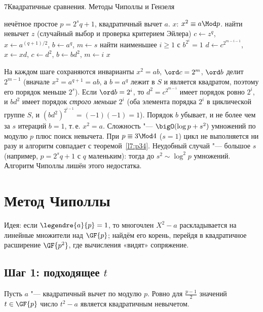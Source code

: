 \begin{lecture}{7}{Квадратичные сравнения. Методы Чиполлы и Гензеля}
\begin{algorithm}
\begin{algorithmic}[1]
\Require нечётное простое $p = 2^s q + 1$, квадратичный вычет $a$.
\Ensure $x$: $x^2 \equiv a \Mod p$.
\State найти невычет $z$ (случайный выбор и проверка критерием Эйлера)
\State $c \gets z^q$, $x \gets a^{(q+1)/2}$, $b \gets a^q$, $m \gets s$
  \State найти наименьшее $i \ge 1$ с $b^{2^i} = 1$ 
  \State $d \gets c^{2^{m - i - 1}}$, $x \gets x d$, $c \gets d^2$, $b \gets b d^2$, $m \gets i$
\EndWhile
\State \Return $x$
\end{algorithmic}
\end{algorithm}

На каждом шаге сохраняются инварианты $x^2 = ab$, $\ord c = 2^m$, $\ord b$ делит $2^{m-1}$
(вначале $x^2 = a^{q+1} = a b$, а $b = a^q$ лежит в $S$ и является квадратом, поэтому его
порядок меньше $2^s$). Если $\ord b = 2^i$, то $d^2 = c^{2^{m-i}}$ имеет порядок ровно $2^i$, и
$b d^2$ имеет порядок \emph{строго меньше} $2^i$ (оба элемента порядка $2^i$ в циклической
группе $S$, и $(bd^2)^{2^{i-1}} = (-1)(-1) = 1$). Порядок $b$ убывает, и не более чем за $s$
итераций $b = 1$, т.\,е. $x^2 = a$. Сложность "--- $\bigO(\log p + s^2)$ умножений по модулю $p$
плюс поиск невычета. При $p \equiv 3 \Mod 4$ ($s = 1$) цикл не выполняется ни разу и алгоритм
совпадает с теоремой~\ref{l7:p34}. Неудобный случай "--- большое $s$ (например,
$p = 2^{s} q + 1$ с $q$ маленьким): тогда до $s^2 \sim \log^2 p$ умножений. Алгоритм Чиполлы
лишён этого недостатка.

\section{Метод Чиполлы}\label{l7:sec-cipolla}

Идея: если $\legendre{a}{p} = 1$, то многочлен $X^2 - a$ раскладывается на линейные
множители над $\GF{p}$; найдём его корень, перейдя в квадратичное расширение $\GF{p^2}$, где
вычисления «видят» сопряжение.

\subsection{\texorpdfstring{Шаг 1: подходящее $t$}{Шаг 1: подходящее t}}

\begin{lemma}\label{l7:cipolla-t}
Пусть $a$ "--- квадратичный вычет по модулю $p$. Ровно для $\frac{p-1}{2}$ значений
$t \in \GF{p}$ число $t^2 - a$ является квадратичным невычетом.
\end{lemma}


\end{lecture}
